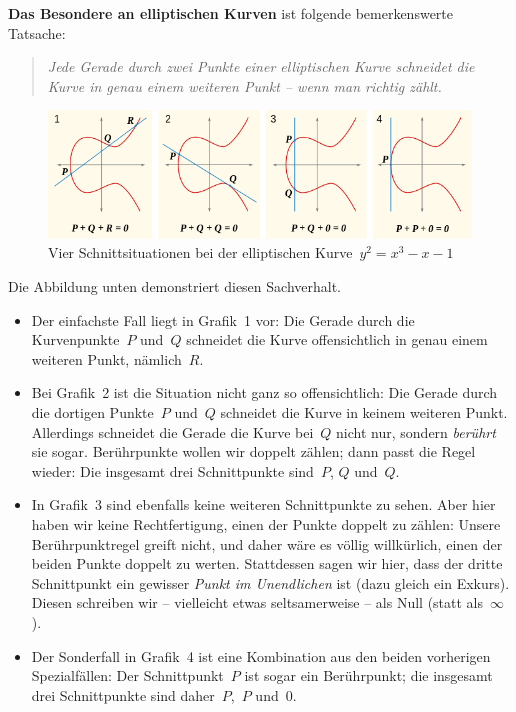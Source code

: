 \documentclass{../zirkelblatt}
\begin{document}
\textbf{Das Besondere an elliptischen Kurven} ist folgende bemerkenswerte Tatsache:
\begin{quote}
\emph{Jede Gerade durch zwei Punkte einer elliptischen Kurve schneidet die Kurve in
\emph{genau einem weiteren Punkt} -- wenn man richtig zählt.}
\end{quote}
\begin{figure}[b]
  \centering
  \includegraphics[scale=0.6]{elliptic-curve-r}
  \caption{Vier Schnittsituationen bei der elliptischen Kurve~$y^2 = x^3 - x - 1$}
\end{figure}
Die Abbildung unten demonstriert diesen Sachverhalt.
\begin{itemize}
\item Der einfachste Fall liegt
in Grafik~1 vor: Die Gerade durch die Kurvenpunkte~$P$ und~$Q$ schneidet die
Kurve offensichtlich in genau einem weiteren Punkt, nämlich~$R$.
\item Bei Grafik~2
ist die Situation nicht ganz so offensichtlich: Die Gerade durch die dortigen
Punkte~$P$ und~$Q$ schneidet die Kurve in keinem weiteren Punkt. Allerdings
schneidet die Gerade die Kurve bei~$Q$ nicht nur, sondern \emph{berührt} sie
sogar. Berührpunkte wollen wir doppelt zählen; dann passt die Regel wieder: Die
insgesamt drei Schnittpunkte sind~$P$, $Q$ und~$Q$.
\item In Grafik~3 sind ebenfalls keine weiteren Schnittpunkte zu sehen. Aber
hier haben wir keine Rechtfertigung, einen der Punkte doppelt zu zählen: Unsere
Berührpunktregel greift nicht, und daher wäre es völlig willkürlich, einen der
beiden Punkte doppelt zu werten. Stattdessen sagen wir hier,
dass der dritte Schnittpunkt ein gewisser \emph{Punkt im Unendlichen} ist (dazu
gleich ein Exkurs).
Diesen schreiben wir -- vielleicht etwas seltsamerweise -- als Null (statt
als~$\infty$).
\item Der Sonderfall in Grafik~4 ist eine Kombination aus den beiden vorherigen
Spezialfällen: Der Schnittpunkt~$P$ ist sogar ein Berührpunkt; die insgesamt
drei Schnittpunkte sind daher~$P$,~$P$ und~$0$.
\end{itemize}
\end{document}
